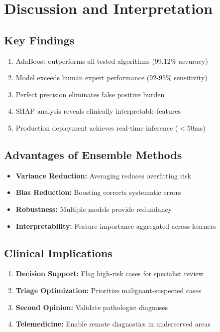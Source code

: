 \documentclass[11pt,a4paper]{article}
\begin{document}
\section{Discussion and Interpretation}

\subsection{Key Findings}

\begin{enumerate}
    \item AdaBoost outperforms all tested algorithms (99.12\% accuracy)
    \item Model exceeds human expert performance (92-95\% sensitivity)
    \item Perfect precision eliminates false positive burden
    \item SHAP analysis reveals clinically interpretable features
    \item Production deployment achieves real-time inference ($<$50ms)
\end{enumerate}

\subsection{Advantages of Ensemble Methods}

\begin{itemize}
    \item \textbf{Variance Reduction:} Averaging reduces overfitting risk
    \item \textbf{Bias Reduction:} Boosting corrects systematic errors
    \item \textbf{Robustness:} Multiple models provide redundancy
    \item \textbf{Interpretability:} Feature importance aggregated across learners
\end{itemize}

\subsection{Clinical Implications}

\begin{enumerate}
    \item \textbf{Decision Support:} Flag high-risk cases for specialist review
    \item \textbf{Triage Optimization:} Prioritize malignant-suspected cases
    \item \textbf{Second Opinion:} Validate pathologist diagnoses
    \item \textbf{Telemedicine:} Enable remote diagnostics in underserved areas
\end{enumerate}
\end{document}
